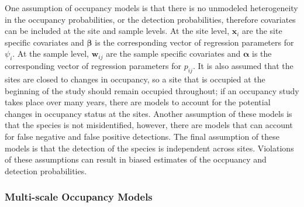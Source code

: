 \documentclass[12pt]{article}\usepackage[]{graphicx}\usepackage[]{color}
\begin{document}
\noindent One assumption of occupancy models is that there is no unmodeled heterogeneity in the occupancy probabilities, or the detection probabilities, therefore covariates can be included at the site and sample levels. At the site level, $\bm{x}_i$ are the site specific covariates and $\bm{\beta}$ is the corresponding vector of regression parameters for $\psi_i$. At the sample level, $\bm{w}_{ij}$ are the sample specific covariates and $\bm{\alpha}$ is the corresponding vector of regression parameters for $p_{ij}$. It is also assumed that the sites are closed to changes in occupancy, so a site that is occupied at the beginning of the study should remain occupied throughout; if an occupancy study takes place over many years, there are models to account for the potential changes in occupancy status at the sites. Another assumption of these models is that the species is not misidentified, however, there are models that can account for false negative and false positive detections. The final assumption of these models is that the detection of the species is independent across sites. Violations of these assumptions can result in biased estimates of the occpuancy and detection probabilities. 

\subsubsection{Multi-scale Occupancy Models}
\end{document}
